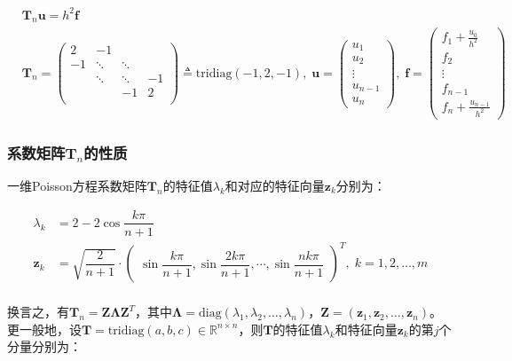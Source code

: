 \documentclass[12pt, UTF8, nofonts]{ctexart}
\begin{document}
\begin{eqnarray*}
    \label{eq:1dpoissonmat}
    & \boldsymbol{T}_n\boldsymbol{u} = h^2\boldsymbol{f} \\
    & \boldsymbol{T}_n = \begin{pmatrix}
        2 & -1 & & \\
        -1 & \ddots & \ddots & \\
        & \ddots & \ddots & -1 \\
        & & -1 & 2 \\
    \end{pmatrix} \triangleq \mathrm{tridiag}(-1,2,-1), \;
    \boldsymbol{u} = \begin{pmatrix}u_1 \\ u_2 \\ \vdots \\ u_{n-1} \\ u_n\end{pmatrix},\;
    \boldsymbol{f} = \begin{pmatrix}
        f_1+\frac{u_0}{h^2} \\ f_2 \\ \vdots \\ f_{n-1} \\
        f_n+\frac{u_{n-1}}{h^2}
    \end{pmatrix}
\end{eqnarray*}

\subsubsection*{系数矩阵$\boldsymbol{T}_n$的性质}

一维Poisson方程系数矩阵$\boldsymbol{T}_n$的特征值$\lambda_k$和对应的特征向量$\boldsymbol{z}_k$分别为：

\begin{equation}
    \label{eq:1dpoissoneig}
    \begin{aligned}
        \lambda_k & = 2 - 2\cos\dfrac{k\pi}{n+1} \\
        \boldsymbol{z}_k & = \sqrt{\dfrac{2}{n+1}} \cdot
        \begin{pmatrix}
            \sin\dfrac{k\pi}{n+1}, \sin\dfrac{2k\pi}{n+1}, \cdots,
            \sin\dfrac{nk\pi}{n+1}
        \end{pmatrix}^T, \; k=1,2,\ldots, m \\
\end{aligned}
\end{equation}

换言之，有$\boldsymbol{T}_n=\boldsymbol{Z\Lambda Z}^T$，其中$\boldsymbol{\Lambda}=\mathrm{diag}(\lambda_1,\lambda_2,\ldots,\lambda_n)$，$\boldsymbol{Z}=(\boldsymbol{z}_1,\boldsymbol{z}_2,\ldots,\boldsymbol{z}_n)$。更一般地，设$\boldsymbol{T}=\mathrm{tridiag}(a,b,c)\in\mathbb{R}^{n \times n}$，则$\boldsymbol{T}$的特征值$\lambda_k$和特征向量$\boldsymbol{z}_k$的第$j$个分量分别为：
\end{document}

